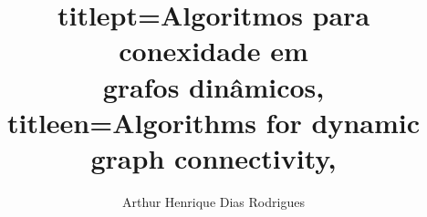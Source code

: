 \documentclass[12pt,twoside,english,brazilian]{book}
\title{
    titlept={Algoritmos para conexidade em\\ grafos dinâmicos},
    titleen={Algorithms for dynamic graph connectivity},
}
\author{Arthur Henrique Dias Rodrigues}
\begin{document}

\frontmatter

\pagestyle{plain}

\onehalfspacing %

\maketitle %









\makeatletter
\if@openright\cleardoublepage\else\clearpage\fi
\makeatother


\newcommand\disablenewpage[1]{{\let\clearpage\par\let\cleardoublepage\par #1}}
\end{document}
